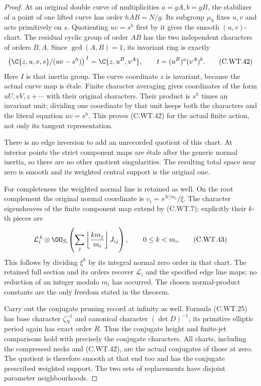 \begin{proof}
At an original double curve
of multiplicities \(a=gA,b=gB\),
the stabilizer of a point of
one lifted curve has order
\(hAB=N/g\). Its subgroup
\(\mu_h\) fixes \(u,v\) and
acts primitively on \(s\).
Quotienting \(uv=s^h\) first
by it gives the smooth
\((u,v)\)-chart. The residual
cyclic group of order \(AB\)
has the two independent
characters of orders \(B,A\).
Since \(\gcd(A,B)=1\), its
invariant ring is exactly
\[
 \bigl(\C\{z,u,v,s\}/(uv-s^h)\bigr)^{\,I}
       =\C\{z,u^B,v^A\},\qquad
                  t=(u^B)^a(v^A)^b .
 \tag{C.WT.42}
\]
Here \(I\) is that inertia
group. The curve coordinate
\(z\) is invariant, because
the actual curve map is
\'{e}tale. Finite character
averaging gives coordinates
of the form \(uU,vV,z+\cdots\)
with their original characters.
Their product is \(s^h\)
times an invariant unit;
dividing one coordinate by
that unit keeps both the
characters and the literal
equation \(uv=s^h\).
This proves (C.WT.42) for the
actual finite action, not
only its tangent representation.

There is no edge inversion
to add an unrecorded quotient
of this chart. At interior
points the strict component
maps are \'{e}tale after the
generic normal inertia, so
there are no other quotient
singularities. The resulting
total space near zero is
smooth and its weighted
central support is the
original one.

For completeness the weighted
normal line is retained as
well. On the root complement
the original normal coordinate
is \(v_i=s^{N/m_i}/\xi\).
The character eigensheaves
of the finite component map
extend by (C.WT.7); explicitly
their \(k\)-th pieces are
\[
 \mathcal L_i^{\,k}\otimes
  \OO_{S_i}\!\left(
       \sum_j\left\lfloor\frac{k m_j}{m_i}\right\rfloor J_{ij}
             \right),\qquad 0\le k<m_i .
 \tag{C.WT.43}
\]
This follows by dividing
\(\xi^k\) by its integral
normal zero order in that
chart. The retained full
section and its orders
recover \(\mathcal L_i\)
and the specified edge line
maps; no reduction of an
integer modulo \(m_i\)
has occurred. The chosen
normal-product constants
are the only freedom stated
in the theorem.

Carry out the conjugate
pruning record at infinity
as well. Formula (C.WT.25)
has base character
\(\zeta_N^{-1}\) and canonical
character \((\det D)^{-1}\);
its primitive elliptic period
again has exact order \(R\).
Thus the conjugate height
and finite-jet comparisons
hold with precisely the
conjugate characters.
All charts, including the
compressed necks and
(C.WT.42), are the actual
conjugates of those at zero.
The quotient is therefore
smooth at that end too and
has the conjugate prescribed
weighted support. The two
sets of replacements have
disjoint parameter
neighbourhoods.


\end{proof}
